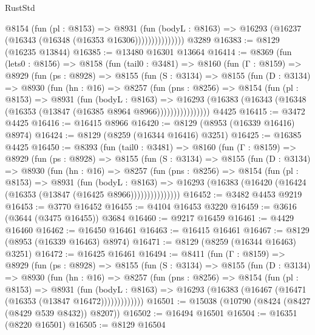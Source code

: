 \begin{lexlean}{RustStd}
\begin{coremodule}
                    @8154
                      (fun (pl : @8153) =>
                      @8931
                        (fun (bodyL : @8163) =>
                        @16293 (@16237 (@16343 (@16348 (@16353 @16306)))))))))))))))
    @3289
@16383 := @8129 (@16235 @13844)
@16385 := @13480 @16301 @13664
@16414 := @8369
    (fun (lets0 : @8156) =>
    @8158
      (fun (tail0 : @3481) =>
      @8160
        (fun (Γ : @8159) =>
        @8929
          (fun (ps : @8928) =>
          @8155
            (fun (S : @3134) =>
            @8155
              (fun (D : @3134) =>
              @8930
                (fun (hn : @16) =>
                @8257
                  (fun (pns : @8256) =>
                  @8154
                    (fun (pl : @8153) =>
                    @8931
                      (fun (bodyL : @8163) =>
                      @16293
                        (@16383 (@16343 (@16348 (@16353 (@13847 (@16385 @8964 @8966))))))))))))))))
    @4425
@16415 := @3472 @4425
@16416 := @16415 @8966
@16420 := @8129 (@8953 (@16339 @16416) @8974)
@16424 := @8129 (@8259 (@16344 @16416) @3251)
@16425 := @16385 @4425
@16450 := @8393
    (fun (tail0 : @3481) =>
    @8160
      (fun (Γ : @8159) =>
      @8929
        (fun (ps : @8928) =>
        @8155
          (fun (S : @3134) =>
          @8155
            (fun (D : @3134) =>
            @8930
              (fun (hn : @16) =>
              @8257
                (fun (pns : @8256) =>
                @8154
                  (fun (pl : @8153) =>
                  @8931
                    (fun (bodyL : @8163) =>
                    @16293 (@16383 (@16420 (@16424 (@16353 (@13847 (@16425 @8966)))))))))))))))
@16452 := @3482 @4453 @9219
@16453 := @3770 @16452
@16455 := @4104 @16453 @3220
@16459 := @3616 (@3644 (@3475 @16455)) @3684
@16460 := @9217 @16459
@16461 := @4429 @16460
@16462 := @16450 @16461
@16463 := @16415 @16461
@16467 := @8129 (@8953 (@16339 @16463) @8974)
@16471 := @8129 (@8259 (@16344 @16463) @3251)
@16472 := @16425 @16461
@16494 := @8411
    (fun (Γ : @8159) =>
    @8929
      (fun (ps : @8928) =>
      @8155
        (fun (S : @3134) =>
        @8155
          (fun (D : @3134) =>
          @8930
            (fun (hn : @16) =>
            @8257
              (fun (pns : @8256) =>
              @8154
                (fun (pl : @8153) =>
                @8931
                  (fun (bodyL : @8163) =>
                  @16293 (@16383 (@16467 (@16471 (@16353 (@13847 @16472)))))))))))))
@16501 := @15038 (@10790 (@8424 (@8427 (@8429 @539 @8432)) @8207))
@16502 := @16494 @16501
@16504 := @16351 (@8220 @16501)
@16505 := @8129 @16504

\end{coremodule}
\end{lexlean}
